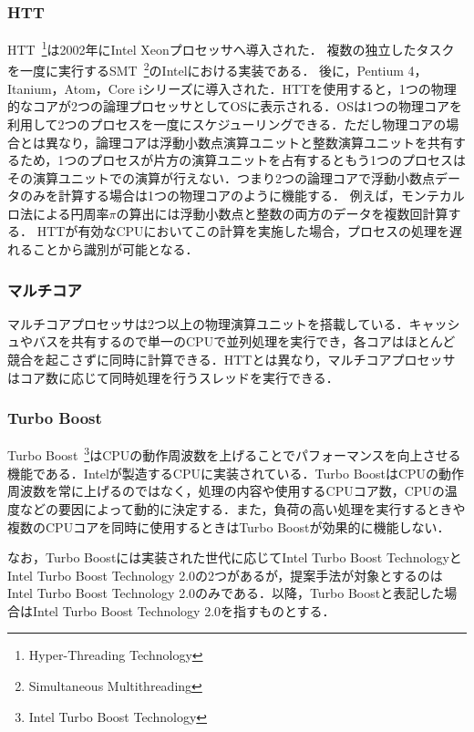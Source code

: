 \subsubsection{HTT}
HTT~\footnote{Hyper-Threading Technology}は2002年にIntel Xeonプロセッサへ導入された．
複数の独立したタスクを一度に実行するSMT~\footnote{Simultaneous Multithreading}のIntelにおける実装である．
後に，Pentium 4，Itanium，Atom，Core iシリーズに導入された．HTTを使用すると，1つの物理的なコアが2つの論理プロセッサとしてOSに表示される．OSは1つの物理コアを利用して2つのプロセスを一度にスケジューリングできる．ただし物理コアの場合とは異なり，論理コアは浮動小数点演算ユニットと整数演算ユニットを共有するため，1つのプロセスが片方の演算ユニットを占有するともう1つのプロセスはその演算ユニットでの演算が行えない．つまり2つの論理コアで浮動小数点データのみを計算する場合は1つの物理コアのように機能する．
例えば，モンテカルロ法による円周率$\pi$の算出には浮動小数点と整数の両方のデータを複数回計算する．
HTTが有効なCPUにおいてこの計算を実施した場合，プロセスの処理を遅れることから識別が可能となる．
\subsubsection{マルチコア}
マルチコアプロセッサは2つ以上の物理演算ユニットを搭載している．キャッシュやバスを共有するので単一のCPUで並列処理を実行でき，各コアはほとんど競合を起こさずに同時に計算できる．HTTとは異なり，マルチコアプロセッサはコア数に応じて同時処理を行うスレッドを実行できる．
\subsubsection{Turbo Boost}
Turbo Boost~\footnote{Intel Turbo Boost Technology}はCPUの動作周波数を上げることでパフォーマンスを向上させる機能である．Intelが製造するCPUに実装されている．Turbo BoostはCPUの動作周波数を常に上げるのではなく，処理の内容や使用するCPUコア数，CPUの温度などの要因によって動的に決定する．また，負荷の高い処理を実行するときや複数のCPUコアを同時に使用するときはTurbo Boostが効果的に機能しない．

なお，Turbo Boostには実装された世代に応じてIntel Turbo Boost TechnologyとIntel Turbo Boost Technology 2.0の2つがあるが，提案手法が対象とするのはIntel Turbo Boost Technology 2.0のみである．以降，Turbo Boostと表記した場合はIntel Turbo Boost Technology 2.0を指すものとする．
